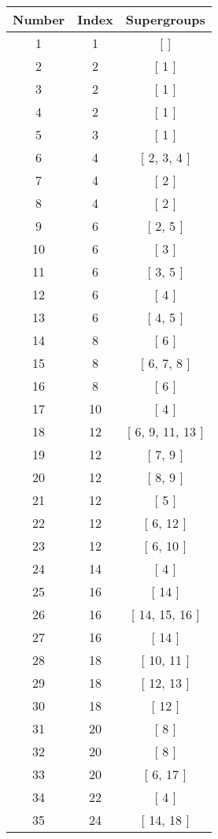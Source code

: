 \begin{center}
\begin{longtable}[H]{|| c c c ||}
\hline
Number & Index & Supergroups \\ 
\hline
1 & 1 & [ ] \\ 
\hline
2 & 2 & [ 1 ] \\ 
\hline
3 & 2 & [ 1 ] \\ 
\hline
4 & 2 & [ 1 ] \\ 
\hline
5 & 3 & [ 1 ] \\ 
\hline
6 & 4 & [ 2, 3, 4 ] \\ 
\hline
7 & 4 & [ 2 ] \\ 
\hline
8 & 4 & [ 2 ] \\ 
\hline
9 & 6 & [ 2, 5 ] \\ 
\hline
10 & 6 & [ 3 ] \\ 
\hline
11 & 6 & [ 3, 5 ] \\ 
\hline
12 & 6 & [ 4 ] \\ 
\hline
13 & 6 & [ 4, 5 ] \\ 
\hline
14 & 8 & [ 6 ] \\ 
\hline
15 & 8 & [ 6, 7, 8 ] \\ 
\hline
16 & 8 & [ 6 ] \\ 
\hline
17 & 10 & [ 4 ] \\ 
\hline
18 & 12 & [ 6, 9, 11, 13 ] \\ 
\hline
19 & 12 & [ 7, 9 ] \\ 
\hline
20 & 12 & [ 8, 9 ] \\ 
\hline
21 & 12 & [ 5 ] \\ 
\hline
22 & 12 & [ 6, 12 ] \\ 
\hline
23 & 12 & [ 6, 10 ] \\ 
\hline
24 & 14 & [ 4 ] \\ 
\hline
25 & 16 & [ 14 ] \\ 
\hline
26 & 16 & [ 14, 15, 16 ] \\ 
\hline
27 & 16 & [ 14 ] \\ 
\hline
28 & 18 & [ 10, 11 ] \\ 
\hline
29 & 18 & [ 12, 13 ] \\ 
\hline
30 & 18 & [ 12 ] \\ 
\hline
31 & 20 & [ 8 ] \\ 
\hline
32 & 20 & [ 8 ] \\ 
\hline
33 & 20 & [ 6, 17 ] \\ 
\hline
34 & 22 & [ 4 ] \\ 
\hline
35 & 24 & [ 14, 18 ] \\ 

\end{longtable}
\end{center}
